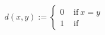 \documentclass[preview]{standalone}
\begin{document}
\begin{align*}
d(x,y) := \begin{cases}0  &  \text{ if} \ x=y \\1 &  \text{ if}\end{cases}
\end{align*}
\end{document}
